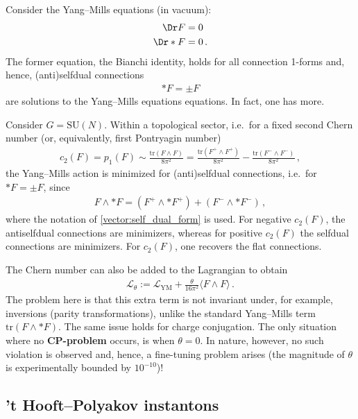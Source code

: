     Consider the Yang--Mills equations (in vacuum):
    \begin{align*}
        \Dr F &= 0\\
        \Dr\ast F &= 0\,.
    \end{align*}
    The former equation, the Bianchi identity, holds for all connection 1-forms and, hence, (anti)selfdual connections
    \begin{gather}
        \ast F = \pm F
    \end{gather}
    are solutions to the Yang--Mills equations equations. In fact, one has more.
    \begin{property}
        Consider $G=\mathrm{SU}(N)$. Within a topological sector, i.e.~for a fixed second Chern number (or, equivalently, first Pontryagin number)
        \begin{gather}
            c_2(F) = p_1(F) \sim \frac{\mathrm{tr}(F\wedge F)}{8\pi^2} = \frac{\mathrm{tr}(F^+\wedge F^+)}{8\pi^2} - \frac{\mathrm{tr}(F^-\wedge F^-)}{8\pi^2}\,,
        \end{gather}
        the Yang--Mills action is minimized for (anti)selfdual connections, i.e.~for $\ast F=\pm F$, since
        \begin{gather*}
            F\wedge\ast F = (F^+\wedge\ast F^+)+(F^-\wedge\ast F^-)\,,
        \end{gather*}
        where the notation of \cref{vector:self_dual_form} is used. For negative $c_2(F)$, the antiselfdual connections are minimizers, whereas for positive $c_2(F)$ the selfdual connections are minimizers. For $c_2(F)$, one recovers the flat connections.
    \end{property}

    The Chern number can also be added to the Lagrangian to obtain
    \begin{gather}
        \mathcal{L}_\theta := \mathcal{L}_{\text{YM}} + \frac{\theta}{16\pi^2}\langle F\wedge F\rangle\,.
    \end{gather}
    The problem here is that this extra term is not invariant under, for example, inversions (parity transformations), unlike the standard Yang--Mills term $\mathrm{tr}(F\wedge\ast F)$. The same issue holds for charge conjugation. The only situation where no \textbf{CP-problem} occurs, is when $\theta=0$. In nature, however, no such violation is observed and, hence, a fine-tuning problem arises (the magnitude of $\theta$ is experimentally bounded by $10^{-10}$)!

\subsection{'t Hooft--Polyakov instantons}

